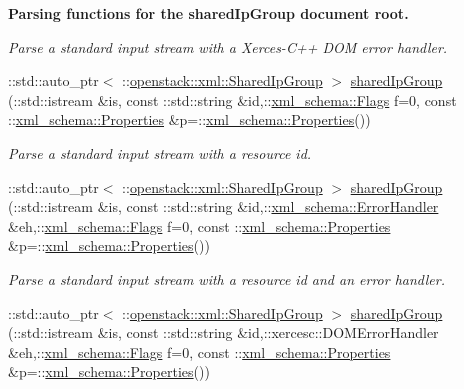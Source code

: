 \begin{Indent}{\bf Parsing functions for the sharedIpGroup document root.}
\begin{DoxyCompactItemize}
\begin{DoxyCompactList}\small\item\em Parse a standard input stream with a Xerces-\/C++ DOM error handler. \item\end{DoxyCompactList}\item 
::std::auto\_\-ptr$<$ ::\hyperlink{classopenstack_1_1xml_1_1SharedIpGroup}{openstack::xml::SharedIpGroup} $>$ \hyperlink{namespaceopenstack_1_1xml_a027c6a45b526f1a5458a57e16c37bb0a}{sharedIpGroup} (::std::istream \&is, const ::std::string \&id,::\hyperlink{namespacexml__schema_affb4c227cbd9aa7453dd1dc5a1401943}{xml\_\-schema::Flags} f=0, const ::\hyperlink{namespacexml__schema_ad27ce19a7ee1d3b1064092648898f64c}{xml\_\-schema::Properties} \&p=::\hyperlink{namespacexml__schema_ad27ce19a7ee1d3b1064092648898f64c}{xml\_\-schema::Properties}())
\begin{DoxyCompactList}\small\item\em Parse a standard input stream with a resource id. \item\end{DoxyCompactList}\item 
::std::auto\_\-ptr$<$ ::\hyperlink{classopenstack_1_1xml_1_1SharedIpGroup}{openstack::xml::SharedIpGroup} $>$ \hyperlink{namespaceopenstack_1_1xml_ae6ac07e1cc1119e136979767d9e75b42}{sharedIpGroup} (::std::istream \&is, const ::std::string \&id,::\hyperlink{namespacexml__schema_ab1c9361bfd3b404eaabf0c31eded79dc}{xml\_\-schema::ErrorHandler} \&eh,::\hyperlink{namespacexml__schema_affb4c227cbd9aa7453dd1dc5a1401943}{xml\_\-schema::Flags} f=0, const ::\hyperlink{namespacexml__schema_ad27ce19a7ee1d3b1064092648898f64c}{xml\_\-schema::Properties} \&p=::\hyperlink{namespacexml__schema_ad27ce19a7ee1d3b1064092648898f64c}{xml\_\-schema::Properties}())
\begin{DoxyCompactList}\small\item\em Parse a standard input stream with a resource id and an error handler. \item\end{DoxyCompactList}\item 
::std::auto\_\-ptr$<$ ::\hyperlink{classopenstack_1_1xml_1_1SharedIpGroup}{openstack::xml::SharedIpGroup} $>$ \hyperlink{namespaceopenstack_1_1xml_a093bde02dfc04b4af7b9f7e52fbd4a89}{sharedIpGroup} (::std::istream \&is, const ::std::string \&id,::xercesc::DOMErrorHandler \&eh,::\hyperlink{namespacexml__schema_affb4c227cbd9aa7453dd1dc5a1401943}{xml\_\-schema::Flags} f=0, const ::\hyperlink{namespacexml__schema_ad27ce19a7ee1d3b1064092648898f64c}{xml\_\-schema::Properties} \&p=::\hyperlink{namespacexml__schema_ad27ce19a7ee1d3b1064092648898f64c}{xml\_\-schema::Properties}())

\end{DoxyCompactItemize}
\end{Indent}
